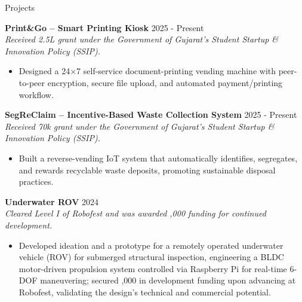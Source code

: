 \documentclass[10pta]{resume} %
\begin{document}
\begin{rSection}{Projects}

\textbf{Print\&Go – Smart Printing Kiosk}  \href{https://printandgo.co.in}{\faGlobe}
\hfill 2025 - Present\\
    \textit{Received \rupee2.5L grant under the Government of Gujarat’s Student Startup \& Innovation Policy (SSIP).}
    \begin{itemize}
    \item Designed a 24×7 self-service document-printing vending machine with peer-to-peer encryption, secure file upload, and automated payment/printing workflow.
\end{itemize}

\textbf{SegReClaim – Incentive-Based Waste Collection System} \href{https://segreclaim.rikinparekh.in}{\faGlobe} \hfill 2025 - Present\\
    \textit{Received \rupee70k grant under the Government of Gujarat’s Student Startup \& Innovation Policy (SSIP).}
     \begin{itemize}
    
    \item Built a reverse-vending IoT system that automatically identifies, segregates, and rewards recyclable waste deposits, promoting sustainable disposal practices.
\end{itemize}

\textbf{Underwater ROV} \hfill 2024\\
    \textit{Cleared Level I of Robofest and was awarded ,000 funding for continued development.}
 \begin{itemize}

    \item Developed ideation and a prototype for a remotely operated underwater vehicle (ROV) for submerged structural inspection, engineering a BLDC motor-driven propulsion system controlled via Raspberry Pi for real-time 6-DOF maneuvering; secured ,000 in development funding upon advancing at Robofest, validating the design's technical and commercial potential.

\end{itemize}


\end{rSection}
\end{document}
